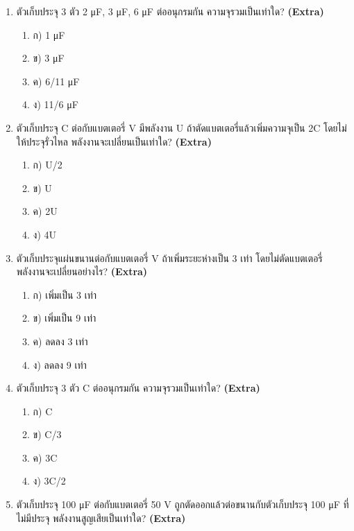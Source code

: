 \documentclass[12pt]{article}
\begin{document}
\begin{enumerate}[label=\arabic*.]
\begin{enumerate}[label=)]
\item ก) ตัวเก็บประจุกระดาษ
\item ข) ตัวเก็บประจุแผ่นขนานอากาศ
\item ค) ตัวเก็บประจุเซรามิก/อิเล็กโทรไลติก
\item ง) ตัวเก็บประจุแก้ว
\end{enumerate}
\item ตัวเก็บประจุ 3 ตัว 2 μF, 3 μF, 6 μF ต่ออนุกรมกัน ความจุรวมเป็นเท่าใด? \hfill \textbf{\small (Extra)}
\begin{enumerate}[label=)]
\item ก) 1 μF
\item ข) 3 μF
\item ค) 6/11 μF
\item ง) 11/6 μF
\end{enumerate}
\item ตัวเก็บประจุ C ต่อกับแบตเตอรี่ V มีพลังงาน U ถ้าตัดแบตเตอรี่แล้วเพิ่มความจุเป็น 2C โดยไม่ให้ประจุรั่วไหล พลังงานจะเปลี่ยนเป็นเท่าใด? \hfill \textbf{\small (Extra)}
\begin{enumerate}[label=)]
\item ก) U/2
\item ข) U
\item ค) 2U
\item ง) 4U
\end{enumerate}
\item ตัวเก็บประจุแผ่นขนานต่อกับแบตเตอรี่ V ถ้าเพิ่มระยะห่างเป็น 3 เท่า โดยไม่ตัดแบตเตอรี่ พลังงานจะเปลี่ยนอย่างไร? \hfill \textbf{\small (Extra)}
\begin{enumerate}[label=)]
\item ก) เพิ่มเป็น 3 เท่า
\item ข) เพิ่มเป็น 9 เท่า
\item ค) ลดลง 3 เท่า
\item ง) ลดลง 9 เท่า
\end{enumerate}
\item ตัวเก็บประจุ 3 ตัว C ต่ออนุกรมกัน ความจุรวมเป็นเท่าใด? \hfill \textbf{\small (Extra)}
\begin{enumerate}[label=)]
\item ก) C
\item ข) C/3
\item ค) 3C
\item ง) 3C/2
\end{enumerate}
\item ตัวเก็บประจุ 100 μF ต่อกับแบตเตอรี่ 50 V ถูกตัดออกแล้วต่อขนานกับตัวเก็บประจุ 100 μF ที่ไม่มีประจุ พลังงานสูญเสียเป็นเท่าใด? \hfill \textbf{\small (Extra)}

\end{enumerate}
\end{document}
